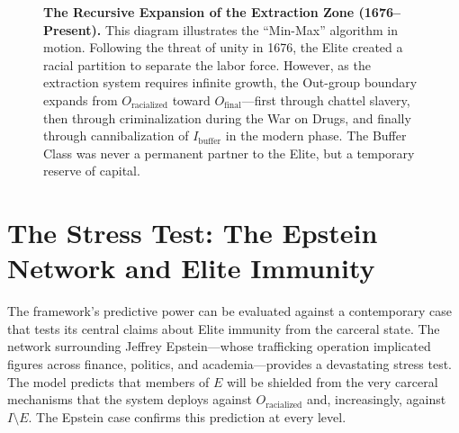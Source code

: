 \documentclass[12pt,openany]{book}
\begin{document}
\begin{figure}[h]
    \caption{\textbf{The Recursive Expansion of the Extraction Zone (1676--Present).} This diagram illustrates the ``Min-Max'' algorithm in motion. Following the threat of unity in 1676, the Elite created a racial partition to separate the labor force. However, as the extraction system requires infinite growth, the Out-group boundary expands from $O_{\text{racialized}}$ toward $O_{\text{final}}$---first through chattel slavery, then through criminalization during the War on Drugs, and finally through cannibalization of $I_{\text{buffer}}$ in the modern phase. The Buffer Class was never a permanent partner to the Elite, but a temporary reserve of capital.}
    \label{fig:extraction_zone}
\end{figure}
\section{The Stress Test: The Epstein Network and Elite Immunity}

The framework's predictive power can be evaluated against a contemporary case that tests its central claims about Elite immunity from the carceral state. The network surrounding Jeffrey Epstein---whose trafficking operation implicated figures across finance, politics, and academia---provides a devastating stress test. The model predicts that members of $E$ will be shielded from the very carceral mechanisms that the system deploys against $O_{\text{racialized}}$ and, increasingly, against $I \setminus E$. The Epstein case confirms this prediction at every level.
\end{document}
